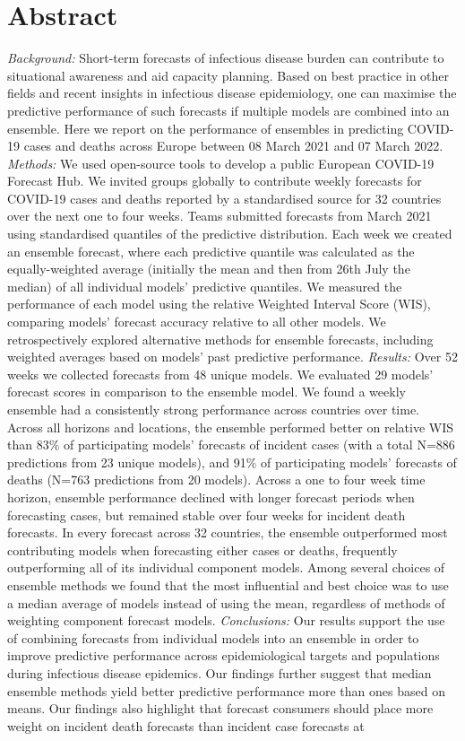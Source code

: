 \documentclass[
]{article}
\begin{document}
\hypertarget{abstract}{%
\section{Abstract}\label{abstract}}

\emph{Background:} Short-term forecasts of infectious disease burden can contribute to situational awareness and aid capacity planning. Based on best practice in other fields and recent insights in infectious disease epidemiology, one can maximise the predictive performance of such forecasts if multiple models are combined into an ensemble. Here we report on the performance of ensembles in predicting COVID-19 cases and deaths across Europe between 08 March 2021 and 07 March 2022. \emph{Methods:} We used open-source tools to develop a public European COVID-19 Forecast Hub. We invited groups globally to contribute weekly forecasts for COVID-19 cases and deaths reported by a standardised source for 32 countries over the next one to four weeks. Teams submitted forecasts from March 2021 using standardised quantiles of the predictive distribution. Each week we created an ensemble forecast, where each predictive quantile was calculated as the equally-weighted average (initially the mean and then from 26th July the median) of all individual models' predictive quantiles. We measured the performance of each model using the relative Weighted Interval Score (WIS), comparing models' forecast accuracy relative to all other models. We retrospectively explored alternative methods for ensemble forecasts, including weighted averages based on models' past predictive performance. \emph{Results:} Over 52 weeks we collected forecasts from 48 unique models. We evaluated 29 models' forecast scores in comparison to the ensemble model. We found a weekly ensemble had a consistently strong performance across countries over time. Across all horizons and locations, the ensemble performed better on relative WIS than 83\% of participating models' forecasts of incident cases (with a total N=886 predictions from 23 unique models), and 91\% of participating models' forecasts of deaths (N=763 predictions from 20 models). Across a one to four week time horizon, ensemble performance declined with longer forecast periods when forecasting cases, but remained stable over four weeks for incident death forecasts. In every forecast across 32 countries, the ensemble outperformed most contributing models when forecasting either cases or deaths, frequently outperforming all of its individual component models. Among several choices of ensemble methods we found that the most influential and best choice was to use a median average of models instead of using the mean, regardless of methods of weighting component forecast models. \emph{Conclusions:} Our results support the use of combining forecasts from individual models into an ensemble in order to improve predictive performance across epidemiological targets and populations during infectious disease epidemics. Our findings further suggest that median ensemble methods yield better predictive performance more than ones based on means. Our findings also highlight that forecast consumers should place more weight on incident death forecasts than incident case forecasts at 
\end{document}
